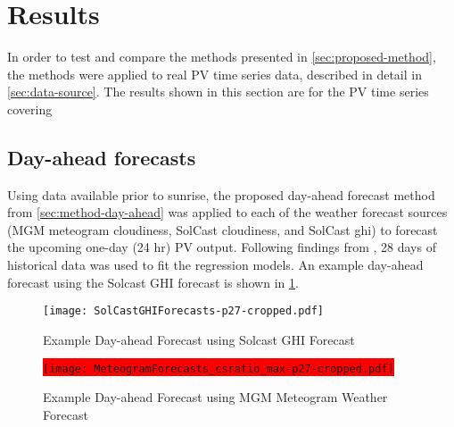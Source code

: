 \section{Results}
\label{sec:results}

In order to test and compare the methods presented in \cref{sec:proposed-method},
the methods were applied to real PV time series data, described in detail in \cref{sec:data-source}.
The results shown in this section are for the PV time series covering

\subsection{Day-ahead forecasts}

Using data available prior to sunrise, the proposed day-ahead forecast method from  \cref{sec:method-day-ahead} was applied to each of the weather forecast sources
(MGM meteogram cloudiness, SolCast cloudiness, and SolCast ghi)
to forecast the upcoming one-day (24 hr) PV output.
Following findings from \cite{Almeida2015},
28 days of historical data was used to fit the regression models.
An example day-ahead forecast using the Solcast GHI forecast is shown in \cref{fig:dayahead-forecast-solcast}. %
\begin{removal}
\end{removal}


\begin{figure}[!ht]
	\centering
	\texttt{[image: SolCastGHIForecasts-p27-cropped.pdf]}
	\caption{Example Day-ahead Forecast using Solcast GHI Forecast}
	\label{fig:dayahead-forecast-solcast}
\end{figure}


\begin{removal}
\begin{figure}[tbh]
	\centering
	\colorbox{red}{
	\texttt{[image: MeteogramForecasts\_csratio\_max-p27-cropped.pdf]}}
	\caption{Example Day-ahead Forecast using MGM Meteogram Weather Forecast}
	\label{fig:dayahead-forecast-meteogram}
\end{figure}
\end{removal}

